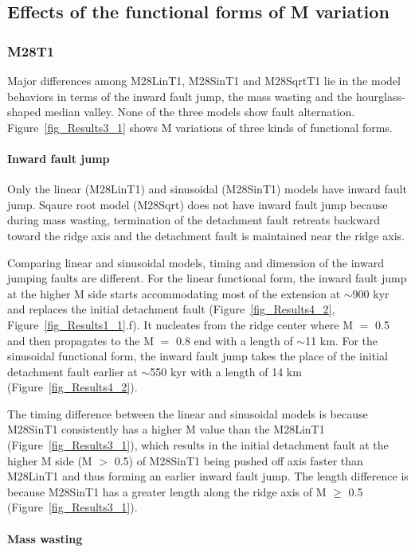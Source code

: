 \documentclass[draft,gc]{agutex}
\begin{document}
\begin{article}
\subsection{Effects of the functional forms of M variation}
\subsubsection{M28T1}
Major differences among M28LinT1, M28SinT1 and M28SqrtT1 lie in the model behaviors in terms of the inward fault jump, the mass wasting and the hourglass-shaped median valley. None of the three models show fault alternation. Figure~\ref{fig_Results3_1} shows M variations of three kinds of functional forms.

\paragraph{Inward fault jump}\label{para_InwardFaultJump}
Only the linear (M28LinT1) and sinusoidal (M28SinT1) models have inward fault jump. Sqaure root model (M28Sqrt) does not have inward fault jump because during mass wasting, termination of the detachment fault retreats backward toward the ridge axis and the detachment fault is maintained near the ridge axis.

Comparing linear and sinusoidal models, timing and dimension of the inward jumping faults are different. For the linear functional form, the inward fault jump at the higher M side starts accommodating most of the extension at $\sim$900 kyr and replaces the initial detachment fault (Figure~\ref{fig_Results4_2}, Figure~\ref{fig_Results1_1}.f). It nucleates from the ridge center where M $=$ 0.5 and then propagates to the M $=$ 0.8 end with a length of $\sim$11 km. For the sinusoidal functional form, the inward fault jump takes the place of the initial detachment fault earlier at $\sim$550 kyr with a length of 14 km (Figure~\ref{fig_Results4_2}).

The timing difference between the linear and sinusoidal models is because M28SinT1 consistently has a higher M value than the M28LinT1 (Figure~\ref{fig_Results3_1}), which results in the initial detachment fault at the higher M side (M $>$ 0.5) of M28SinT1 being pushed off axis faster than M28LinT1 and thus forming an earlier inward fault jump. The length difference is because M28SinT1 has a greater length along the ridge axis of M $\ge$ 0.5 (Figure~\ref{fig_Results3_1}).

\paragraph{Mass wasting}


\end{article}
\end{document}
